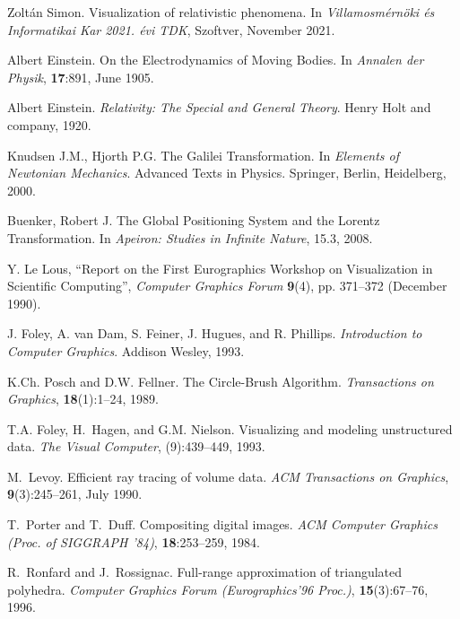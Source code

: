 \documentclass{egpubl}
\begin{document}
\begin{thebibliography}{1}


 Zoltán Simon.
\newblock Visualization of relativistic phenomena.
In \emph{Villamosmérnöki és Informatikai Kar 2021. évi TDK}, Szoftver, November 2021.

 Albert Einstein.
\newblock On the Electrodynamics of Moving Bodies.
In \emph{Annalen der Physik}, \textbf{17}:891, June 1905.

 Albert Einstein.
\newblock \emph{Relativity: The Special and General Theory}.
Henry Holt and company, 1920.

 Knudsen J.M., Hjorth P.G. The Galilei Transformation.
In \emph{Elements of Newtonian Mechanics}. Advanced Texts in Physics. Springer, Berlin, Heidelberg, 2000.

 Buenker, Robert J.
\newblock The Global Positioning System and the Lorentz Transformation.
In \emph{Apeiron: Studies in Infinite Nature}, 15.3, 2008.




 Y. Le Lous,
``Report on the First Eurographics Workshop on Visualization in
Scientific Computing'', \emph{Computer Graphics Forum\/}
\textbf{9}(4), pp. 371--372 (December 1990).

J. Foley, A. van Dam, S. Feiner, J. Hugues, and R. Phillips.
\newblock \emph{Introduction to Computer Graphics}.
\newblock Addison Wesley, 1993.

K.Ch. Posch and D.W. Fellner.
\newblock The Circle-Brush Algorithm.
\newblock \emph{Transactions on Graphics}, \textbf{18}(1):1--24, 1989.

T.A. Foley, H.~Hagen, and G.M. Nielson.
\newblock Visualizing and modeling unstructured data.
\newblock \emph{The Visual Computer}, (9):439--449, 1993.

M.~Levoy.
\newblock Efficient ray tracing of volume data.
\newblock \emph{ACM Transactions on Graphics},
          \textbf{9}(3):245--261, July 1990.

T.~Porter and T.~Duff.
\newblock Compositing digital images.
\newblock \emph{ACM Computer Graphics (Proc. of SIGGRAPH '84)},
          \textbf{18}:253--259, 1984.

R.~Ronfard and J.~Rossignac.
\newblock Full-range approximation of triangulated polyhedra.
\newblock \emph{Computer Graphics Forum (Eurographics'96 Proc.)},
          \textbf{15}(3):67--76, 1996.

\end{thebibliography}
\end{document}
